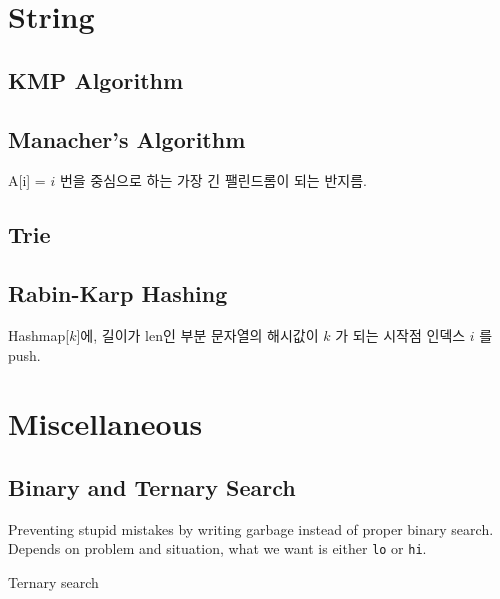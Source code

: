 \documentclass[landscape,8pt]{article}
\begin{document}
\begin{multicols}{2}



\section{String}
  \subsection{KMP Algorithm}
    
  \subsection{Manacher's Algorithm}
    A[i] = $i$ 번을 중심으로 하는 가장 긴 팰린드롬이 되는 반지름.
    
  \subsection{Trie}
    
  \subsection{Rabin-Karp Hashing}
    Hashmap[$k$]에, 길이가 len인 부분 문자열의 해시값이 $k$ 가 되는 시작점 인덱스 $i$ 를 push.
    
\columnbreak

\section{Miscellaneous}
  \subsection{Binary and Ternary Search}
    Preventing stupid mistakes by writing garbage instead of proper binary search.\\
    Depends on problem and situation, what we want is either \texttt{lo} or \texttt{hi}.
    
    Ternary search
    

\end{multicols}
\end{document}
